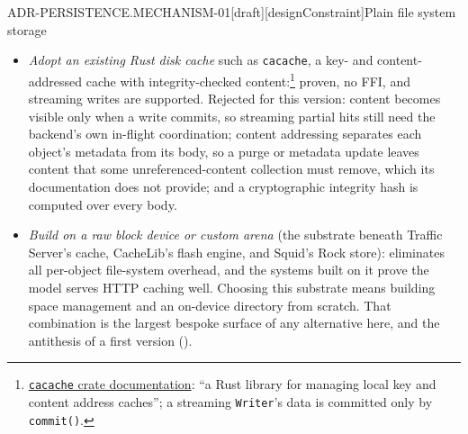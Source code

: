 \begin{requirement}{ADR-PERSISTENCE.MECHANISM-01}[draft][designConstraint]{Plain file system storage}
\begin{itemize}
      engines remove the FFI cost as well, but their unit of storage is the
      record --- a body streaming in with unknown length
      () must be chunked into records by the
      application --- and streaming partial hits
      () need the same in-memory
      coordination beside the store anyway. Cross-process use during a hot
      upgrade also varies by engine: RocksDB admits no multi-process
      writers,\footnote{\url{https://github.com/facebook/rocksdb/wiki/RocksDB-FAQ\#basic-readwrite}}
      so the incoming process could not write while the outgoing one still
      holds the database open, whereas the LMDB family allows several
      processes, one write transaction at a
      time.\footnote{\url{https://github.com/erthink/libmdbx\#gotchas}}
    \item \emph{Adopt an existing Rust disk cache} such as \texttt{cacache}, a
      key- and content-addressed cache with integrity-checked
      content:\footnote{\href{https://docs.rs/cacache/latest/cacache/}{\texttt{cacache}
      crate documentation}: ``a Rust library for managing local key and
      content address caches''; a streaming \texttt{Writer}'s data is
      committed only by \texttt{commit()}.} proven, no FFI, and streaming
      writes are supported. Rejected for this version: content becomes
      visible only when a write commits, so streaming partial hits still need
      the backend's own in-flight coordination; content addressing separates
      each object's metadata from its body, so a purge or metadata update
      leaves content that some unreferenced-content collection must remove,
      which its documentation does not provide; and a cryptographic integrity
      hash is computed over every body.
    \item \emph{Build on a raw block device or custom arena} (the
      substrate beneath Traffic Server's cache, CacheLib's flash engine,
      and Squid's Rock store): eliminates all per-object file-system overhead,
      and the systems built on it prove the model serves HTTP caching well.
      Choosing this substrate means building space
      management and an on-device directory from scratch. That
      combination is the largest bespoke surface of any alternative
      here, and the antithesis of a first version
      ().
  \end{itemize}


\end{requirement}
